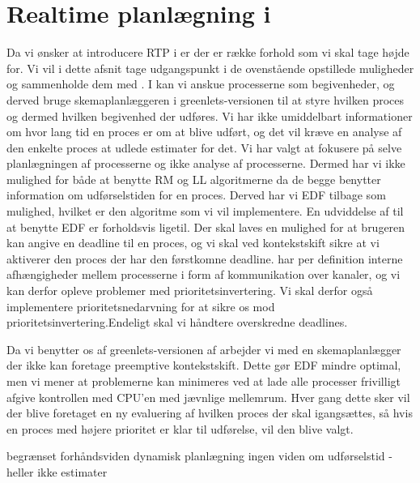 \section{Realtime planlægning i \pycsp}
Da vi ønsker at introducere RTP i \pycsp er der er række forhold som vi skal tage højde for. Vi vil i dette afsnit tage udgangspunkt i de ovenstående opstillede muligheder og sammenholde dem med \pycsp. 
I \pycsp kan vi anskue processerne som begivenheder, og derved bruge skemaplanlæggeren i greenlets-versionen til at styre hvilken proces og dermed hvilken begivenhed der udføres. Vi har ikke umiddelbart informationer om hvor lang tid en proces er om at blive udført, og det vil kræve en analyse af den enkelte proces at udlede estimater for det. Vi har valgt at fokusere på selve planlægningen af processerne og ikke analyse af processerne. Dermed har vi ikke mulighed for både at benytte RM og LL algoritmerne da de begge benytter information om udførselstiden for en proces. Derved har vi EDF tilbage som mulighed, hvilket er den algoritme som vi vil implementere. En udviddelse af \pycsp til at benytte EDF er forholdsvis ligetil. Der skal laves en mulighed for at brugeren kan angive en deadline til en proces, og vi skal ved kontekstskift sikre at vi aktiverer den proces der har den førstkomne deadline. \pycsp har per definition interne afhængigheder mellem processerne i form af kommunikation over kanaler, og vi kan derfor opleve problemer med prioritetsinvertering. Vi skal derfor også implementere prioritetsnedarvning for at sikre os mod prioritetsinvertering.Endeligt skal vi håndtere overskredne deadlines. 

Da vi benytter os af greenlets-versionen af \pycsp arbejder vi med en skemaplanlægger der ikke kan foretage preemptive kontekstskift. Dette gør EDF mindre optimal, men vi mener at problemerne kan minimeres ved at lade alle processer frivilligt afgive kontrollen med CPU'en med jævnlige mellemrum. Hver gang dette sker vil der blive foretaget en ny evaluering af hvilken proces der skal igangsættes, så hvis en proces med højere prioritet er klar til udførelse, vil den blive valgt. 


begrænset forhåndsviden 
  dynamisk planlægning
  ingen viden om udførselstid - heller ikke estimater  

